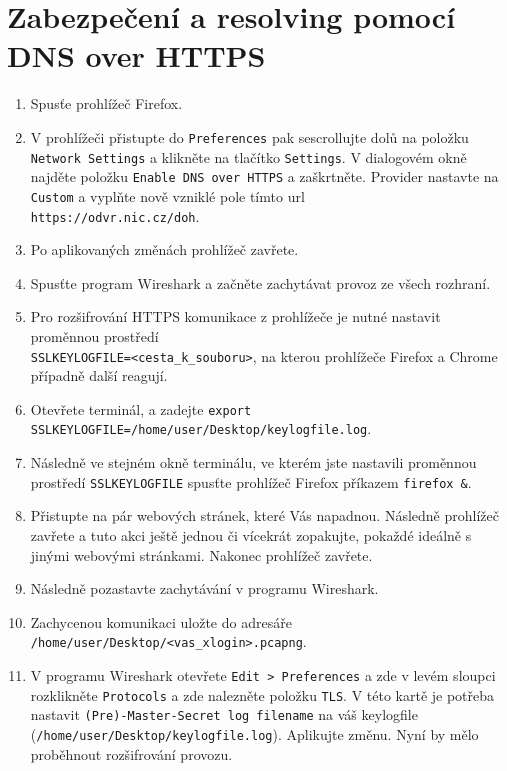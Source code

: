 \section{Zabezpečení a resolving pomocí DNS over HTTPS}
\begin{enumerate}
    \item Spusťe prohlížeč Firefox.
    \item V prohlížeči přistupte do \texttt{Preferences} pak sescrollujte dolů na položku \texttt{Network Settings} a klikněte na tlačítko \texttt{Settings}. V dialogovém okně najděte položku \texttt{Enable DNS over HTTPS} a zaškrtněte. Provider nastavte na \texttt{Custom} a vyplňte nově vzniklé pole tímto url\\ \texttt{https://odvr.nic.cz/doh}.
    \item Po aplikovaných změnách prohlížeč zavřete.
    \item Spusťte program Wireshark a začněte zachytávat provoz ze všech rozhraní.
    \item Pro rozšifrování HTTPS komunikace z prohlížeče je nutné nastavit proměnnou prostředí\\ \texttt{SSLKEYLOGFILE=<cesta\_k\_souboru>}, na kterou prohlížeče Firefox a Chrome případně další reagují.
    \item Otevřete terminál, a zadejte \texttt{export SSLKEYLOGFILE=/home/user/Desktop/keylogfile.log}.
    \item Následně ve stejném okně terminálu, ve kterém jste nastavili proměnnou prostředí \texttt{SSLKEYLOGFILE} spusťte prohlížeč Firefox příkazem \texttt{firefox \&}.
    \item Přistupte na pár webových stránek, které Vás napadnou. Následně prohlížeč zavřete a tuto akci ještě jednou či vícekrát zopakujte, pokaždé ideálně s jinými webovými stránkami. Nakonec prohlížeč zavřete.
    \item Následně pozastavte zachytávání v programu Wireshark.
    \item Zachycenou komunikaci uložte do adresáře \texttt{/home/user/Desktop/<vas\_xlogin>.pcapng}.
    \item V programu Wireshark otevřete \texttt{Edit > Preferences} a zde v levém sloupci rozklikněte \texttt{Protocols} a zde nalezněte položku \texttt{TLS}. V této kartě je potřeba nastavit \texttt{(Pre)-Master-Secret log filename} na váš keylogfile (\texttt{/home/user/Desktop/keylogfile.log}). Aplikujte změnu. Nyní by mělo proběhnout rozšifrování provozu.

\end{enumerate}
